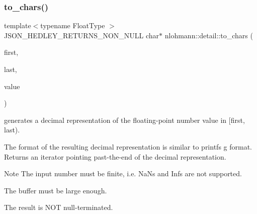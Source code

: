 \subsubsection{\texorpdfstring{to\+\_\+chars()}{to\_chars()}}
{\footnotesize\ttfamily template$<$typename Float\+Type $>$ \\
J\+S\+O\+N\+\_\+\+H\+E\+D\+L\+E\+Y\+\_\+\+R\+E\+T\+U\+R\+N\+S\+\_\+\+N\+O\+N\+\_\+\+N\+U\+LL char$\ast$ nlohmann\+::detail\+::to\+\_\+chars (\begin{DoxyParamCaption}\item[{char $\ast$}]{first,  }\item[{const char $\ast$}]{last,  }\item[{Float\+Type}]{value }\end{DoxyParamCaption})}



generates a decimal representation of the floating-\/point number value in \mbox{[}first, last). 

The format of the resulting decimal representation is similar to printf\textquotesingle{}s g format. Returns an iterator pointing past-\/the-\/end of the decimal representation.

\begin{DoxyNote}{Note}
The input number must be finite, i.\+e. NaN\textquotesingle{}s and Inf\textquotesingle{}s are not supported. 

The buffer must be large enough. 

The result is N\+OT null-\/terminated. 
\end{DoxyNote}

